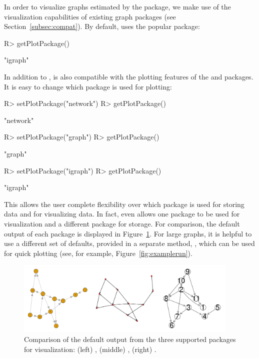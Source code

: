 \documentclass[article]{jss}
\renewcommand{\|}{\,|\,}
\begin{document}
In order to visualize graphs estimated by the  package, we make use of the visualization capabilities of existing graph packages (see Section~\ref{subsec:compat}). By default,  uses the popular  package:
%
\begin{CodeChunk}
\begin{CodeInput}
R> getPlotPackage()
\end{CodeInput}
\begin{CodeOutput}                          
[1] "igraph"
\end{CodeOutput}
\end{CodeChunk}
%
In addition to ,  is also compatible with the plotting features of the  \citep[via ,][]{hansen2016} and  packages. It is easy to change which package is used for plotting:
%
\begin{CodeChunk}
\begin{CodeInput}
R> setPlotPackage("network")
R> getPlotPackage()
\end{CodeInput}
\begin{CodeOutput}                          
[1] "network"
\end{CodeOutput}
\begin{CodeInput}
R> setPlotPackage("graph")
R> getPlotPackage()
\end{CodeInput}
\begin{CodeOutput}                          
[1] "graph"
\end{CodeOutput}
\begin{CodeInput}
R> setPlotPackage("igraph")
R> getPlotPackage()
\end{CodeInput}
\begin{CodeOutput}                          
[1] "igraph"
\end{CodeOutput}
\end{CodeChunk}
%
This allows the user complete flexibility over which 
package is used for storing data and for visualizing data. In fact,
 even allows one package to be used for visualization
and a different package for storage. For comparison, the default
output of each package is displayed in
Figure~\ref{fig:cytocompare}. For large graphs, it is helpful to use a
different set of defaults, provided in a separate method,
, which can be used for quick plotting (see, for
example, Figure~\ref{fig:examplerun}).

\begin{figure}[t!]
\centering
\includegraphics[width=0.95\textwidth]{cyto-compare-pkgs.pdf}
\caption{Comparison of the default output from the three supported  packages for visualization: (left) , (middle) , (right) .}
\label{fig:cytocompare}
\end{figure}
\end{document}
